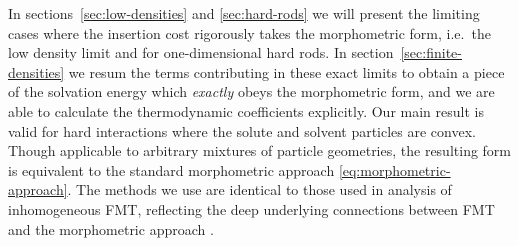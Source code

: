 \documentclass[11pt,twoside]{report}
\begin{document}
In sections~\ref{sec:low-densities} and \ref{sec:hard-rods} we will present the limiting cases where the insertion cost rigorously takes the morphometric form, i.e.\ the low density limit and for one-dimensional hard rods.
In section~\ref{sec:finite-densities} we resum the terms contributing in these exact limits to obtain a piece of the solvation energy which \emph{exactly} obeys the morphometric form, and we are able to calculate the thermodynamic coefficients explicitly.
Our main result is valid for hard interactions where the solute and solvent particles are convex.
Though applicable to arbitrary mixtures of particle geometries, the resulting form is equivalent to the standard morphometric approach \eqref{eq:morphometric-approach}.
The methods we use are identical to those used in analysis of inhomogeneous FMT, reflecting the deep underlying connections between FMT and the morphometric approach \cite{LeithallPRE2011,KordenPRE2012,MarechalPRE2014}.



\end{document}
